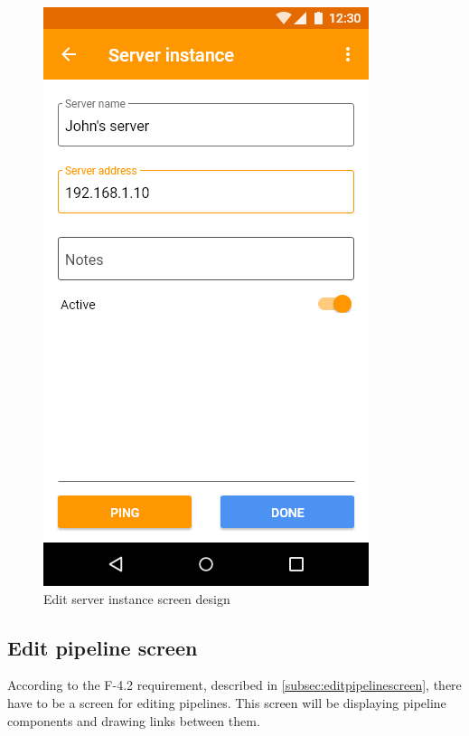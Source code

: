 \begin{figure}\centering
    \begin{minipage}[b]{0.32\textwidth}
    	\includegraphics[width=\textwidth]{pics/xd/Edit server instance.png}
    	\caption[Edit server instance]{Edit server instance screen design}\label{fig:xdEditServerInstance}
    \end{minipage}
\end{figure}

\subsection{Edit pipeline screen}
According to the F-4.2 requirement, described in \autoref{subsec:editpipelinescreen}, there have to be a screen for editing pipelines.
This screen will be displaying pipeline components and drawing links between them.

